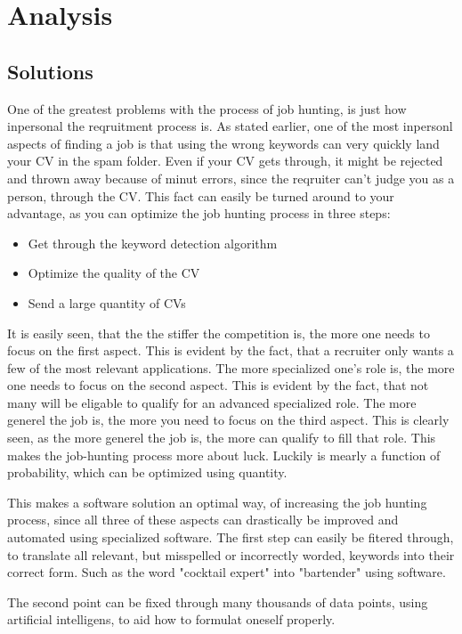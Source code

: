 \section{Analysis}\label{sec:analysis}

\subsection{Solutions}
One of the greatest problems with the process of job hunting, is just how inpersonal
the reqruitment process is. As stated earlier, one of the most inpersonl aspects
of finding a job is that using the wrong keywords can very
quickly land your CV in the spam folder.
Even if your CV gets through, it might be rejected and thrown away because of
minut errors, since the reqruiter can't judge you as a person, through the CV.
This fact can easily be turned around to your advantage, as you can optimize the
job hunting process in three steps:
\begin{itemize}
  \item Get through the keyword detection algorithm
  \item Optimize the quality of the CV
  \item Send a large quantity of CVs
\end{itemize}

It is easily seen, that the the stiffer the competition is, the more one 
needs to focus on the first aspect. This is evident by the fact, that a 
recruiter only wants a few of the most relevant applications.
The more specialized one's role is, the more one needs to focus on the second
aspect. This is evident by the fact, that not many will be eligable to qualify
for an advanced specialized role.
The more generel the job is, the more you need to focus on the third
aspect. This is clearly seen, as the more generel the job is, the more can 
qualify to fill that role. This makes the job-hunting process more about luck.
Luckily is mearly a function of probability, which can be optimized using
quantity.

This makes a software solution an optimal way, of increasing the job hunting
process, since all three of these aspects can drastically be improved and automated
using specialized software. 
The first step can easily be fitered through, to translate all relevant, but
misspelled or incorrectly worded, keywords into their correct form. Such
as the word "cocktail expert" into "bartender" using software.

The second point can be fixed through many thousands of data points, using
artificial intelligens, to aid how to formulat oneself properly. 

